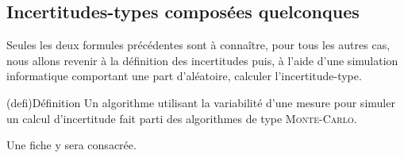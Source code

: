 \documentclass[../main/main.tex]{subfiles}
\begin{document}
\subsection{Incertitudes-types composées quelconques}
Seules les deux formules précédentes sont à connaître, pour tous les autres cas,
nous allons revenir à la définition des incertitudes puis, à l'aide d'une
simulation informatique comportant une part d'aléatoire, calculer
l'incertitude-type.
\begin{tcb}(defi){Définition}
  Un algorithme utilisant la variabilité d'une mesure pour simuler un calcul
d'incertitude fait parti des algorithmes de type \textsc{Monte-Carlo}.
\end{tcb}
Une fiche y sera consacrée.
\end{document}
